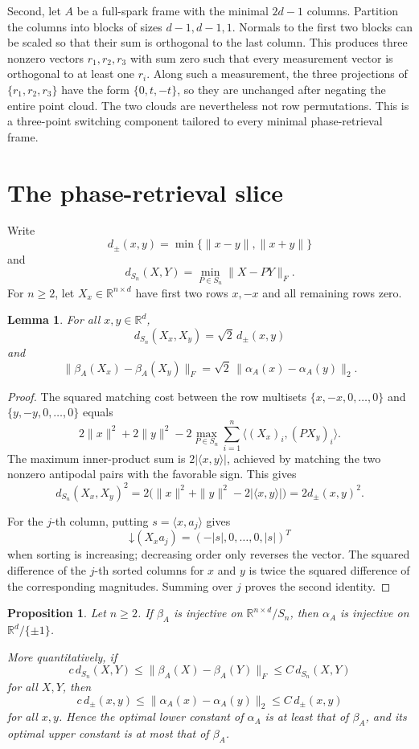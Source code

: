 \documentclass[11pt]{article}
\newtheorem{proposition}[theorem]{Proposition}
\newtheorem{lemma}[theorem]{Lemma}
\newcommand{\R}{\mathbb R}
\newcommand{\Sn}{S_n}
\newcommand{\down}{\mathord{\downarrow}}
\begin{document}
Second, let \(A\) be a full-spark frame with the minimal \(2d-1\) columns.
Partition the columns into blocks of sizes \(d-1,d-1,1\).  Normals to the
first two blocks can be scaled so that their sum is orthogonal to the last
column.  This produces three nonzero vectors \(r_1,r_2,r_3\) with sum zero
such that every measurement vector is orthogonal to at least one \(r_i\).
Along such a measurement, the three projections of
\(\{r_1,r_2,r_3\}\) have the form \(\{0,t,-t\}\), so they are unchanged after
negating the entire point cloud.  The two clouds are nevertheless not row
permutations.  This is a three-point switching component tailored to every
minimal phase-retrieval frame.

\section{\texorpdfstring{\hspace{0.35em}}{}The phase-retrieval slice}

Write
\[
 d_{\pm}(x,y)=\min\{\|x-y\|,\|x+y\|\}
\]
and
\[
 d_{\Sn}(X,Y)=\min_{P\in\Sn}\|X-PY\|_F.
\]
For \(n\ge2\), let \(X_x\in\R^{n\times d}\) have first two rows \(x,-x\)
and all remaining rows zero.

\begin{lemma}\label{lem:slice}
For all \(x,y\in\R^d\),
\[
 d_{\Sn}(X_x,X_y)=\sqrt2\,d_{\pm}(x,y)
\]
and
\[
 \|\beta_A(X_x)-\beta_A(X_y)\|_F
 =\sqrt2\,\|\alpha_A(x)-\alpha_A(y)\|_2.
\]
\end{lemma}

\begin{proof}
The squared matching cost between the row multisets
\(\{x,-x,0,\ldots,0\}\) and \(\{y,-y,0,\ldots,0\}\) equals
\[
 2\|x\|^2+2\|y\|^2
 -2\max_{P\in\Sn}\sum_{i=1}^n\langle (X_x)_i,(PX_y)_i\rangle.
\]
The maximum inner-product sum is \(2|\langle x,y\rangle|\), achieved by
matching the two nonzero antipodal pairs with the favorable sign.  This gives
\[
 d_{\Sn}(X_x,X_y)^2
 =2\bigl(\|x\|^2+\|y\|^2-2|\langle x,y\rangle|\bigr)
 =2d_{\pm}(x,y)^2.
\]

For the \(j\)-th column, putting \(s=\langle x,a_j\rangle\) gives
\[
 \down(X_xa_j)=(-|s|,0,\ldots,0,|s|)^T
\]
when sorting is increasing; decreasing order only reverses the vector.
The squared difference of the \(j\)-th sorted columns for \(x\) and \(y\) is
twice the squared difference of the corresponding magnitudes.  Summing over
\(j\) proves the second identity.
\end{proof}

\begin{proposition}\label{prop:oneway}
Let \(n\ge2\).  If \(\beta_A\) is injective on
\(\R^{n\times d}/\Sn\), then \(\alpha_A\) is injective on
\(\R^d/\{\pm1\}\).

More quantitatively, if
\[
 c\,d_{\Sn}(X,Y)\le
 \|\beta_A(X)-\beta_A(Y)\|_F
 \le C\,d_{\Sn}(X,Y)
\]
for all \(X,Y\), then
\[
 c\,d_{\pm}(x,y)\le
 \|\alpha_A(x)-\alpha_A(y)\|_2
 \le C\,d_{\pm}(x,y)
\]
for all \(x,y\).  Hence the optimal lower constant of \(\alpha_A\) is at
least that of \(\beta_A\), and its optimal upper constant is at most that of
\(\beta_A\).
\end{proposition}
\end{document}
